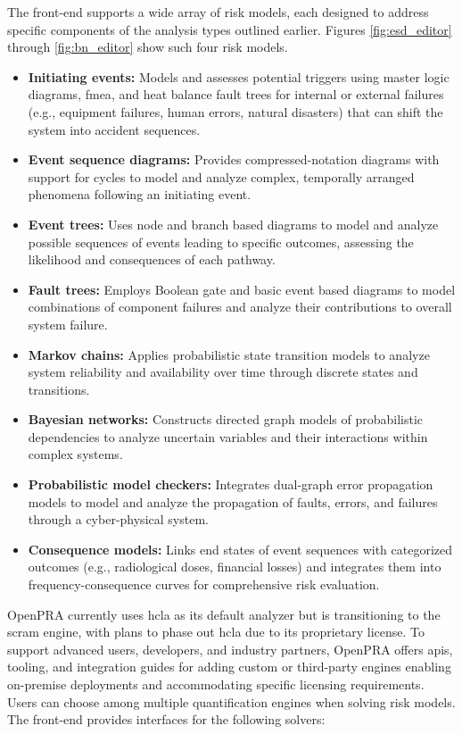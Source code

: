 The front-end supports a wide array of risk models, each designed to address specific components of the analysis types outlined earlier. Figures \ref{fig:esd_editor} through \ref{fig:bn_editor} show such four risk models. 

\begin{itemize}
  \item \textbf{Initiating events:} Models and assesses potential triggers using master logic diagrams, \acrshort{fmea}, and heat balance fault trees for internal or external failures (e.g., equipment failures, human errors, natural disasters) that can shift the system into accident sequences.
  \item \textbf{Event sequence diagrams:} Provides compressed-notation diagrams with support for cycles to model and analyze complex, temporally arranged phenomena following an initiating event.
  \item \textbf{Event trees:} Uses node and branch based diagrams to model and analyze possible sequences of events leading to specific outcomes, assessing the likelihood and consequences of each pathway.
  \item \textbf{Fault trees:} Employs Boolean gate and basic event based diagrams to model combinations of component failures and analyze their contributions to overall system failure.
  \item \textbf{Markov chains:} Applies probabilistic state transition models to analyze system reliability and availability over time through discrete states and transitions.
  \item \textbf{Bayesian networks:} Constructs directed graph models of probabilistic dependencies to analyze uncertain variables and their interactions within complex systems.
  \item \textbf{Probabilistic model checkers:} Integrates dual-graph error propagation models to model and analyze the propagation of faults, errors, and failures through a cyber-physical system.
  \item \textbf{Consequence models:} Links end states of event sequences with categorized outcomes (e.g., radiological doses, financial losses) and integrates them into frequency-consequence curves for comprehensive risk evaluation.
\end{itemize}



OpenPRA currently uses \acrshort{hcla} as its default analyzer but is transitioning to the scram engine, with plans to phase out \acrfull{hcla} due to its proprietary license. To support advanced users, developers, and industry partners, OpenPRA offers \acrfull{api}s, tooling, and integration guides for adding custom or third-party engines enabling on-premise deployments and accommodating specific licensing requirements. Users can choose among multiple quantification engines when solving risk models. The front-end provides interfaces for the following solvers:

